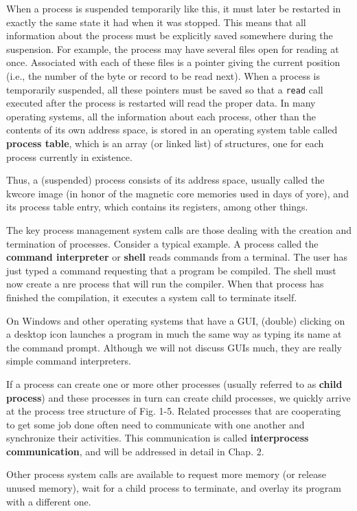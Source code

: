 \documentclass{book}
\newcommand {\kw}  [1] {\textbf{#1}}
\newcommand {\cmd} [1] {\texttt{#1}}
\begin{document}
When a process is suspended temporarily like this, it must later be restarted in exactly the same state it had when it was stopped.
This means that all information about the process must be explicitly saved somewhere during the suspension.
For example, the process may have several files open for reading at once.
Associated with each of these files is a pointer giving the current position (i.e., the number of the byte or record to be read next).
When a process is temporarily suspended, all these pointers must be saved so that 
a \cmd{read} call executed after the process is restarted will read the proper data.
In many operating systems, all the information about each process, other than the contents of its own address space, 
is stored in an operating system table called \kw{process table}, which is an array (or linked list) of structures, 
one for each process currently in existence.

Thus, a (suspended) process consists of its address space, usually called the kw{core image} 
(in honor of the magnetic core memories used in days of yore),
and its process table entry, which contains its registers, among other things. 

The key process management system calls are those dealing with the creation and termination of processes.
Consider a typical example.
A process called the \kw{command interpreter} or \kw{shell} reads commands from a terminal.
The user has just typed a command requesting that a program be compiled.
The shell must now create a nre process that will run the compiler.
When that process has finished the compilation, it executes a system call to terminate itself.

On Windows and other operating systems that have a GUI, (double) clicking on a desktop icon launches a program in much the same way 
as typing its name at the command prompt.
Although we will not discuss GUIs much, they are really simple command interpreters.

If a process can create one or more other processes (usually referred to as \kw{child process}) and these processes in turn can create child processes, 
we quickly arrive at the process tree structure of Fig. 1-5.
Related processes that are cooperating to get some job done often need to communicate with one another and synchronize their activities.
This communication is called \kw{interprocess communication}, and will be addressed in detail in Chap. 2.

Other process system calls are available to request more memory (or release unused memory),
wait for a child process to terminate, and overlay its program with a different one.
\end{document}

